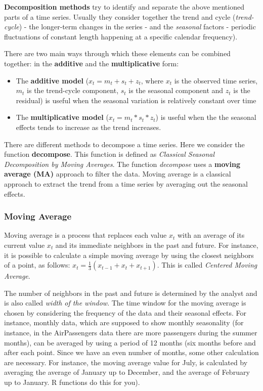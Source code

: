 \documentclass[
]{article}
\providecommand{\tightlist}{%
  \setlength{\itemsep}{0pt}\setlength{\parskip}{0pt}}
\begin{document}
\textbf{Decomposition methods} try to identify and separate the above mentioned parts of a time series. Usually they consider together the trend and cycle (\emph{trend-cycle}) - the longer-term changes in the series - and the \emph{seasonal} factors - periodic fluctuations of constant length happening at a specific calendar frequency).

There are two main ways through which these elements can be combined together: in the \textbf{additive} and the \textbf{multiplicative} form:

\begin{itemize}
\tightlist
\item
  The \textbf{additive model} (\(x_{t} = m_{t} + s_{t} + z_{t}\), where \(x_{t}\) is the observed time series, \(m_{t}\) is the trend-cycle component, \(s_{t}\) is the seasonal component and \(z_{t}\) is the residual) is useful when the seasonal variation is relatively constant over time
\item
  The \textbf{multiplicative model} (\(x_{t} = m_{t} * s_{t} * z_{t}\)) is useful when the the seasonal effects tends to increase as the trend increases.
\end{itemize}

There are different methods to decompose a time series. Here we consider the function \textbf{decompose}. This function is defined as \emph{Classical Seasonal Decomposition by Moving Averages}. The function \emph{decompose} uses a \textbf{moving average (MA)} approach to filter the data. Moving average is a classical approach to extract the trend from a time series by averaging out the seasonal effects.

\hypertarget{moving-average}{%
\subsubsection{Moving Average}\label{moving-average}}

Moving average is a process that replaces each value \(x_{t}\) with an average of its current value \(x_{t}\) and its immediate neighbors in the past and future. For instance, it is possible to calculate a simple moving average by using the closest neighbors of a point, as follows: \(x_{t} = \frac{1}{3} (x_{t-1} + x_{t} + x_{t+1})\). This is called \emph{Centered Moving Average}.

The number of neighbors in the past and future is determined by the analyst and is also called \emph{width of the window}. The time window for the moving average is chosen by considering the frequency of the data and their seasonal effects. For instance, monthly data, which are supposed to show monthly seasonality (for instance, in the AirPassengers data there are more passengers during the summer months), can be averaged by using a period of 12 months (six months before and after each point. Since we have an even number of months, some other calculation are necessary. For instance, the moving average value for July, is calculated by averaging the average of January up to December, and the average of February up to January. R functions do this for you).
\end{document}
